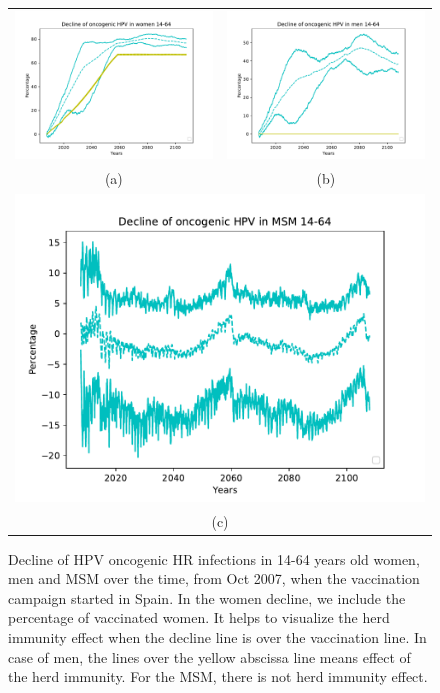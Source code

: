 \begin{figure}[!]
	\centering
	\begin{tabular}{cc}
		\includegraphics[width=0.5\linewidth]{IMGs/5.-Decline_onco/onco_muj.pdf}	& 
		\includegraphics[width=0.5\linewidth]{IMGs/5.-Decline_onco/onco_hom.pdf}  \\ 
		(a)	& (b) \\ 
		\multicolumn{2}{c}{ \includegraphics[width=0.5\linewidth]{IMGs/5.-Decline_onco/onco_MSM.pdf} } \\ 
		\multicolumn{2}{c}{(c)} \\ 
	\end{tabular} 
	\caption{Decline of HPV oncogenic HR infections in 14-64 years old women, men and MSM over the time, from Oct 2007, when the vaccination campaign started in Spain. In the women decline, we include the percentage of vaccinated women. It helps to visualize the herd immunity effect when the decline line is over the vaccination line. In case of men, the lines over the yellow abscissa line means effect of the herd immunity. For the MSM, there is not herd immunity effect.}
	\label{fig:oncoESP}
\end{figure}

